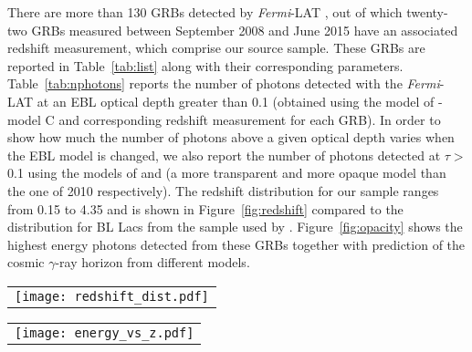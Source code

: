 \documentclass[12pt,preprint]{aastex}
\begin{document}
There are more than 130 GRBs detected by {\it Fermi}-LAT
\citep{2016AAS...22741601V}, out of which {twenty-two} GRBs measured between September
2008 and June 2015 have an associated redshift measurement, which comprise our source sample.
These GRBs are reported in Table~\ref{tab:list} along with their corresponding parameters. { 
Table~\ref{tab:nphotons} reports the number of photons detected with the {\it Fermi}-LAT at an EBL optical depth greater than 0.1 (obtained using the model of \cite{finke10}-model C and corresponding redshift measurement for each GRB).  In order to show how much the number of photons above a given optical depth varies when the EBL model is changed, we also report the number of photons detected at $\tau>$0.1 using the models of \cite{dominguez11} and \cite{kneiske10} (a more transparent and more opaque model than the one of \citeauthor{finke10} 2010 respectively).}
The redshift distribution for our sample ranges from 0.15 to 4.35 and is shown in
Figure~\ref{fig:redshift} compared to the distribution for BL Lacs from the 
sample used by \cite{ebl12}.
  Figure~\ref{fig:opacity} shows the highest energy photons detected from
these GRBs together with prediction of the cosmic $\gamma$-ray horizon
from different models. 


\begin{figure*}[ht!]
  \begin{center}
  \begin{tabular}{c}
    \texttt{[image: redshift\_dist.pdf]} 
  \end{tabular}
  \end{center}
  \caption{Redshift distribution for the sample of {twenty-two} GRBs used here compared to the sample of 150 BL Lacs used in \cite{ebl12}.
\label{fig:redshift}}
\end{figure*}
%
\begin{figure*}[ht!]
  \begin{center}
  \begin{tabular}{c}
    \texttt{[image: energy\_vs\_z.pdf]} 
  \end{tabular}
  \end{center}
  \caption{ Prediction of the cosmic $\gamma$-ray horizon (i.e. the redshift and energy at which $\tau_{\gamma \gamma}=1$) from different models (see legend) along with the highest energy photons from AGNs and GRBs at different redshifts. The GRBs from our sample are denoted by stars, AGNs by dots while the estimates from EBL models are denoted by lines. The two most constraining GRBs in our analysis are labelled in the plot for reference.
\label{fig:opacity}}
\end{figure*}
\end{document}
